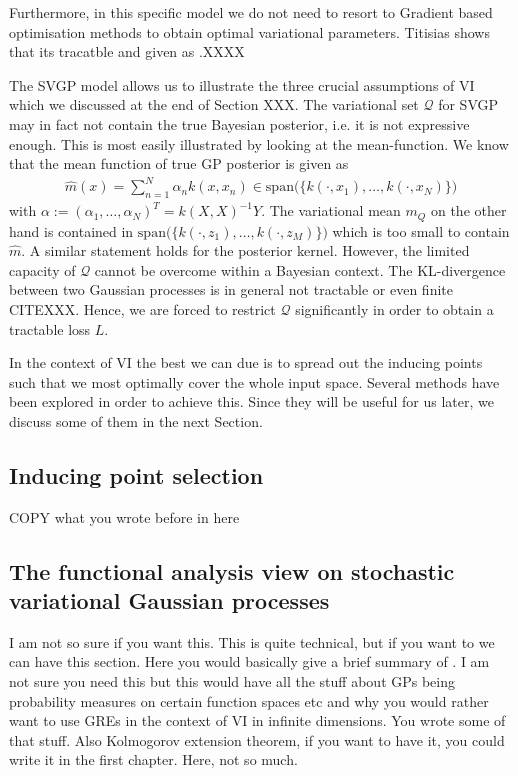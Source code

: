 \documentclass{article}
\newcommand{\calQ}{\mathcal{Q}}
\numberwithin{equation}{section}
\begin{document}
Furthermore, \citet{titsias2009variational} in this specific model we do not need to resort to Gradient based optimisation methods to obtain optimal variational parameters. Titisias shows that its tracatble and given as .XXXX

The SVGP model allows us to illustrate the three crucial assumptions of VI which we discussed at the end of Section XXX. The variational set $\calQ$ for SVGP may in fact not contain the true Bayesian posterior, i.e. it is not expressive enough. This is most easily illustrated by looking at the mean-function. We know that the mean function of true GP posterior is given as
\begin{align}
    \widehat{m}(x) = \sum_{n=1}^N \alpha_n k(x, x_n)  \in \text{span}\big( \{ k(\cdot, x_1), \hdots, k(\cdot, x_N) \} \big)
\end{align}
with $\alpha :=(\alpha_1, \hdots, \alpha_N)^T = k(X,X)^{-1} Y $. The variational mean $m_Q$ on the other hand is contained in $\text{span}\big( \{ k(\cdot, z_1), \hdots, k(\cdot, z_M) \}\big)$ which is too small to contain $\widehat{m}$. A similar statement holds for the posterior kernel. However, the limited capacity of $\calQ$ cannot be overcome within a Bayesian context. The KL-divergence between two Gaussian processes is in general not tractable or even finite CITEXXX. Hence, we are forced to restrict $\calQ$ significantly in order to obtain a tractable loss $L$.

In the context of VI the best we can due is to spread out the inducing points such that we most optimally cover the whole input space. Several methods have been explored in order to achieve this. Since they will be useful for us later, we discuss some of them in the next Section.

\subsection{Inducing point selection}

COPY what you wrote before in here

\subsection{The functional analysis view on stochastic variational Gaussian processes}
I am not so sure if you want this. This is quite technical, but if you want to we can have this section. Here you would basically give a brief summary of \citet{wynne2022variational}. I am not sure you need this but this would have all the stuff about GPs being probability measures on certain function spaces etc and why you would rather want to use GREs in the context of VI in infinite dimensions. You wrote some of that stuff. Also Kolmogorov extension theorem, if you want to have it, you could write it in the first chapter. Here, not so much.
\end{document}
